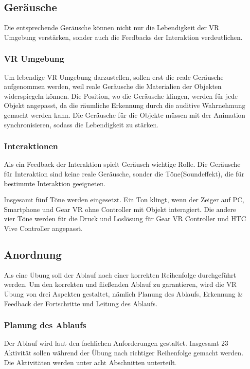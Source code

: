  \subsection{Geräusche}
 Die entsprechende Geräusche können nicht nur die Lebendigkeit der VR Umgebung verstärken, sonder auch die Feedbacks der Interaktion verdeutlichen.
 \subsubsection{VR Umgebung}
 Um lebendige VR Umgebung darzustellen, sollen erst die reale Geräusche aufgenommen werden, weil reale Geräusche die Materialien der Objekten widerspiegeln können. Die Position, wo die Geräusche klingen, werden für jede Objekt angepasst, da die räumliche Erkennung durch die auditive Wahrnehmung gemacht werden kann. Die Geräusche für die Objekte müssen mit der Animation synchronisieren, sodass die Lebendigkeit zu stärken.
 
 \subsubsection{Interaktionen}
 Als ein Feedback der Interaktion spielt Geräusch wichtige Rolle. Die Geräusche für Interaktion sind keine reale Geräusche, sonder die Töne(Soundeffekt), die für bestimmte Interaktion geeigneten.
 
 Insgesamt fünf Töne werden eingesetzt. Ein Ton klingt, wenn der Zeiger auf PC, Smartphone und Gear VR ohne Controller mit Objekt interagiert. Die andere vier Töne werden für die Druck und Loslösung für Gear VR Controller und HTC Vive Controller angepasst.
 
 \subsection{Anordnung}
 Als eine Übung soll der Ablauf nach einer korrekten Reihenfolge durchgeführt werden. Um den korrekten und fließenden Ablauf zu garantieren, wird die VR Übung von drei Aspekten gestaltet, nämlich Planung des Ablaufs, Erkennung \& Feedback der Fortschritte und Leitung des Ablaufs. 
  \subsubsection{Planung des Ablaufs}
      
  Der Ablauf wird laut den fachlichen Anforderungen gestaltet. Insgesamt 23 Aktivität sollen während der Übung nach richtiger Reihenfolge gemacht werden. Die Aktivitäten werden unter acht Abschnitten unterteilt.
  
